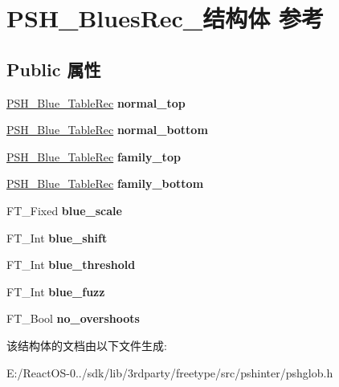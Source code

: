 \hypertarget{struct_p_s_h___blues_rec__}{}\section{P\+S\+H\+\_\+\+Blues\+Rec\+\_\+结构体 参考}
\label{struct_p_s_h___blues_rec__}
\subsection*{Public 属性}
\begin{DoxyCompactItemize}
\item 
\mbox{\label{struct_p_s_h___blues_rec___abd1fdcbf0cea8fc142cafb19c1ebfdc5}} 
\hyperlink{struct_p_s_h___blue___table_rec__}{P\+S\+H\+\_\+\+Blue\+\_\+\+Table\+Rec} {\bfseries normal\+\_\+top}
\item 
\mbox{\label{struct_p_s_h___blues_rec___aed54cd3e8fac122be75c69629cbf2165}} 
\hyperlink{struct_p_s_h___blue___table_rec__}{P\+S\+H\+\_\+\+Blue\+\_\+\+Table\+Rec} {\bfseries normal\+\_\+bottom}
\item 
\mbox{\label{struct_p_s_h___blues_rec___af081f2295931ffe85c35d5651807ceb0}} 
\hyperlink{struct_p_s_h___blue___table_rec__}{P\+S\+H\+\_\+\+Blue\+\_\+\+Table\+Rec} {\bfseries family\+\_\+top}
\item 
\mbox{\label{struct_p_s_h___blues_rec___a46a6039517019d284f67b6745e26570b}} 
\hyperlink{struct_p_s_h___blue___table_rec__}{P\+S\+H\+\_\+\+Blue\+\_\+\+Table\+Rec} {\bfseries family\+\_\+bottom}
\item 
\mbox{\label{struct_p_s_h___blues_rec___a03ed95abe74428a151d835e01e90e553}} 
F\+T\+\_\+\+Fixed {\bfseries blue\+\_\+scale}
\item 
\mbox{\label{struct_p_s_h___blues_rec___ae71354fd580c4d16e5d477d5915c225d}} 
F\+T\+\_\+\+Int {\bfseries blue\+\_\+shift}
\item 
\mbox{\label{struct_p_s_h___blues_rec___ab4e11c74720b6e47d60eceb2cb6c728a}} 
F\+T\+\_\+\+Int {\bfseries blue\+\_\+threshold}
\item 
\mbox{\label{struct_p_s_h___blues_rec___a3f1bbc8e8dc8c3ddec79c4adc5a55e54}} 
F\+T\+\_\+\+Int {\bfseries blue\+\_\+fuzz}
\item 
\mbox{\label{struct_p_s_h___blues_rec___a63d0b7f44d1188f908c2dc0e43a81d95}} 
F\+T\+\_\+\+Bool {\bfseries no\+\_\+overshoots}
\end{DoxyCompactItemize}


该结构体的文档由以下文件生成\+:\begin{DoxyCompactItemize}
\item 
E\+:/\+React\+O\+S-\/0../sdk/lib/3rdparty/freetype/src/pshinter/pshglob.\+h\end{DoxyCompactItemize}
